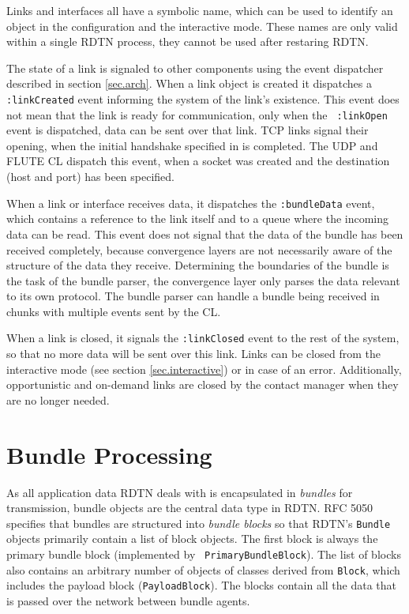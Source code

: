 \documentclass[a4paper]{article}
\begin{document}
Links and interfaces all have a symbolic name, which can be used to identify an
object in the configuration and the interactive mode. These names are only valid
within a single RDTN process, they cannot be used after restaring RDTN.

The state of a link is signaled to other components using the event dispatcher
described in section \ref{sec.arch}. When a link object is created it dispatches
a {\tt :linkCreated} event informing the system of the link's existence. This
event does not mean that the link is ready for communication, only when the {\tt
:linkOpen} event is dispatched, data can be sent over that link. TCP links
signal their opening, when the initial handshake specified in \cite{dtn-tcp-cl} is
completed. The UDP and FLUTE CL dispatch this event, when a socket was created
and the destination (host and port) has been specified.

When a link or interface receives data, it dispatches the {\tt :bundleData}
event, which contains a reference to the link itself and to a queue where the
incoming data can be read. This event does not signal that the data of the
bundle has been received completely, because convergence layers are not
necessarily aware of the structure of the data they receive. Determining the
boundaries of the bundle is the task of the bundle parser, the convergence layer
only parses the data relevant to its own protocol. The bundle parser can
handle a bundle being received in chunks with multiple events sent by
the CL.

When a link is closed, it signals the {\tt :linkClosed} event to the rest of the
system, so that no more data will be sent over this link. Links can be closed
from the interactive mode (see section \ref{sec.interactive}) or in case of an
error. Additionally, opportunistic and on-demand links are closed by the contact
manager when they are no longer needed.

\section{Bundle Processing}\label{sec.bundle-proc}

As all application data RDTN deals with is encapsulated in {\em bundles} for
transmission, bundle objects are the central data type in RDTN. RFC 5050
\cite{bundle-spec} specifies that bundles are structured into {\em bundle
blocks} so that RDTN's {\tt Bundle} objects primarily contain a list of block
objects. The first block is always the primary bundle block (implemented by {\tt
PrimaryBundleBlock}). The list of blocks also contains an arbitrary number of
objects of classes derived from {\tt Block}, which includes the payload block
({\tt PayloadBlock}). The blocks contain all the data that is passed over the
network between bundle agents. 
\end{document}
